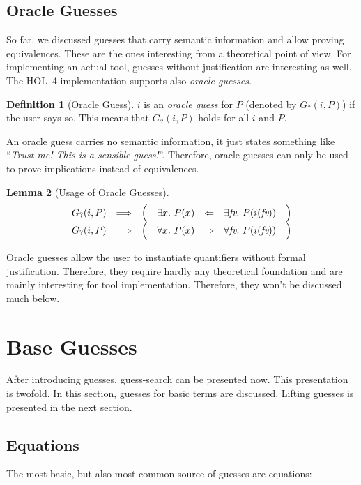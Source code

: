 \documentclass[a4paper,12pt,DIV=12,oneside]{scrbook}
\newcommand{\fv}{\textit{fv}}
\newtheorem{lemma}{Lemma}[section]
\theoremstyle{definition}
\newtheorem{definition}[lemma]{Definition}
\theoremstyle{remark}
\newcommand{\GO}{\ensuremath{G_{?}}}
\begin{document}
\subsection{Oracle Guesses}

So far, we discussed guesses that carry semantic information and allow
proving equivalences. These are the ones interesting from a theoretical point of view.
For implementing an actual tool, guesses without justification are interesting as well.
The HOL~4 implementation supports also \emph{oracle guesses}.
\begin{definition}[Oracle Guess]
  $i$ is an \emph{oracle guess} for $P$ (denoted by $\GO(i,
  P)$) if the user says so. This means that $\GO(i, P)$ holds for all $i$ and $P$.
\end{definition}
%
An oracle guess carries no semantic information, it just states something
like ``\textit{Trust me! This is a sensible guess!}''. Therefore, oracle
guesses can only be used to prove implications instead of
equivalences.
%
\begin{lemma}[Usage of Oracle Guesses]
\[
\begin{array}[t]{cccrclc}
  \GO(i, P) & \Longrightarrow & \Big( & \exists x.\ P(x) & \Leftarrow & \exists \fv.\ P(i(\fv)) & \Big) \\
  \GO(i, P) & \Longrightarrow & \Big( & \forall x.\ P(x) & \Rightarrow & \forall \fv.\ P(i(\fv)) & \Big)
\end{array}
\]
\end{lemma}
%
Oracle guesses allow the user to instantiate quantifiers without formal justification.
Therefore, they require hardly any theoretical foundation and
are mainly interesting for tool implementation. Therefore, they won't be discussed much below.

\section{Base Guesses}
\label{sec_base_guesses}
After introducing guesses, guess-search can be presented now.
This presentation is twofold. In this section, guesses for basic terms are discussed. Lifting guesses
is presented in the next section.

\subsection{Equations}
The most basic, but also most common source of guesses are equations:
\end{document}
